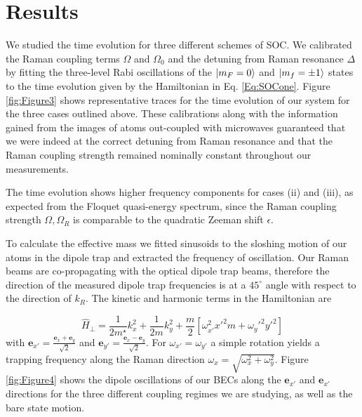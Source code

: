 \section{Results}

We studied the time evolution for three different schemes of SOC. 
We calibrated the Raman coupling terms $\Omega$ and $\Omega_0$ and the detuning from Raman resonance $\Delta$ by fitting the three-level Rabi oscillations of the $|m_F=0\rangle$ and $|m_f=\pm 1\rangle$ states to the time evolution given by the Hamiltonian in Eq. \ref{Eq:SOCone}. Figure \ref{fig:Figure3} shows representative traces for the time evolution of our system for the three cases outlined above. These calibrations along with the information gained from the images of atoms out-coupled  with microwaves guaranteed that we were indeed at the correct detuning from Raman resonance and that the Raman coupling strength remained nominally constant throughout our measurements. 

The time evolution shows higher frequency components for cases (ii) and (iii), as expected from the Floquet quasi-energy spectrum, since the Raman coupling strength $\Omega, \Omega_R$ is comparable to the quadratic Zeeman shift $\epsilon$. 

To calculate the effective mass we fitted sinusoids to the sloshing motion of our atoms in the dipole trap and extracted the frequency of oscillation. Our Raman beams are co-propagating with the optical dipole trap beams, therefore the direction of the measured dipole trap frequencies is at a $45^{\circ}$ angle with respect to the direction of $k_R$. The kinetic and harmonic terms in the Hamiltonian are

\begin{equation}
\hat{H}_{\perp}=\frac{1}{2m^{\star}}k_x^2 + \frac{1}{2m}k_y^2+\frac{m}{2}[\omega_{x'}^2x'^2m+\omega_y'^2y'^2]
\end{equation}
%
with $\mathbf{e}_{x'}=\frac{\mathbf{e}_{x}+\mathbf{e}_{y}}{\sqrt{2}}$ and  $\mathbf{e}_{y'}=\frac{\mathbf{e}_{x}-\mathbf{e}_{y}}{\sqrt{2}}$. For $\omega_{x'}=\omega_{y'}$ a simple rotation yields a trapping frequency along the Raman direction $\omega_x=\sqrt{\omega_x^2+\omega_y^2}$.   
Figure \ref{fig:Figure4} shows the dipole oscillations of our BECs along the $\mathbf{e}_{x'}$ and $\mathbf{e}_{x'}$ directions for the three different coupling regimes we are studying, as well as the bare state motion. 

